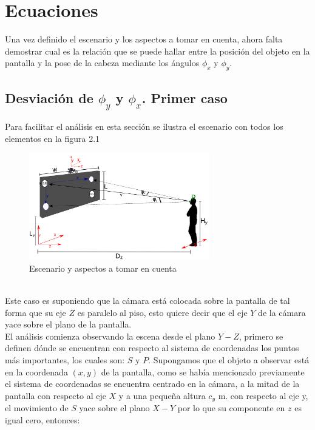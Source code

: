     \section{Ecuaciones}
    Una vez definido el escenario y los aspectos a tomar en cuenta, ahora falta demostrar cual es la relación que se puede hallar entre la posición del objeto en la pantalla y la pose de la cabeza mediante los ángulos $\phi_x$ y $\phi_y$.
    
    \subsection{Desviación de $\phi_y$ y $\phi_x$. Primer caso}
    Para facilitar el análisis en esta sección se ilustra el escenario con todos los elementos en la figura 2.1
    \begin{figure}[htbp]
    	\centering
    	\includegraphics[width=0.7\textwidth]{./pictures/escenario}
    	\caption{Escenario y aspectos a tomar en cuenta}\label{fig: figura}
    \end{figure}
    \\Este caso es suponiendo que la cámara está colocada sobre la pantalla de tal forma que su eje $Z$ es paralelo al piso, esto quiere decir que el eje $Y$ de la cámara yace sobre el plano de la pantalla.\\
     El análisis comienza observando la escena desde el plano $Y-Z$, primero se definen dónde se encuentran con respecto al sistema de coordenadas los puntos más importantes, los cuales son: $S$ y $P$. Supongamos que el objeto a observar está en la coordenada $(x,y)$ de la pantalla, como se había mencionado previamente el sistema de coordenadas se encuentra centrado en la cámara,  a la mitad de la pantalla con respecto al eje $X$ y a una pequeña altura $c_y$ m. con respecto al eje y, el movimiento de $S$ yace sobre el plano $X-Y$ por lo que su componente en $z$ es igual cero, entonces:
    
